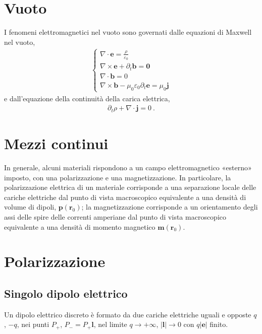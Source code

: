 \documentclass[letterpaper,10pt,italian]{jupyterBook}
\begin{document}
\section{Vuoto}
\label{\detokenize{ch/media:vuoto}}
\sphinxAtStartPar
I fenomeni elettromagnetici nel vuoto sono governati dalle equazioni di Maxwell nel vuoto,
\begin{equation*}
\begin{split}\begin{cases}
\nabla \cdot \mathbf{e} = \frac{\rho}{\varepsilon_0} \\
\nabla \times \mathbf{e} + \partial_t \mathbf{b} = \mathbf{0} \\
\nabla \cdot \mathbf{b} = 0 \\
\nabla \times \mathbf{b} - \mu_0 \varepsilon_0 \partial_t \mathbf{e} = \mu_0 \mathbf{j}
\end{cases}\end{split}
\end{equation*}
\sphinxAtStartPar
e dall’equazione della continuità della carica elettrica,
\begin{equation*}
\begin{split}\partial_t \rho + \nabla \cdot \mathbf{j} = 0 \ .\end{split}
\end{equation*}

\section{Mezzi continui}
\label{\detokenize{ch/media:mezzi-continui}}
\sphinxAtStartPar
In generale, alcuni materiali rispondono a un campo elettromagnetico «esterno» imposto, con una polarizzazione e una magnetizzazione. In particolare, la polarizzazione elettrica di un materiale corrisponde a una separazione locale delle cariche elettriche dal punto di vista macroscopico equivalente a una densità di volume di dipoli, \(\mathbf{p}(\mathbf{r}_0)\); la magnetizzazione corrisponde a un orientamento degli assi delle spire delle correnti amperiane dal punto di vista macroscopico equivalente a una densità di momento magnetico \(\mathbf{m}(\mathbf{r}_0)\).


\section{Polarizzazione}
\label{\detokenize{ch/media:polarizzazione}}

\subsection{Singolo dipolo elettrico}
\label{\detokenize{ch/media:singolo-dipolo-elettrico}}
\sphinxAtStartPar
Un dipolo elettrico discreto è formato da due cariche elettriche uguali e opposte \(q\), \(-q\), nei punti \(P_+\), \(P_- = P_+ \mathbf{l}\), nel limite \(q \rightarrow +\infty\), \(|\mathbf{l}| \rightarrow 0\) con \(q |\mathbf{e}|\) finito.
\end{document}

